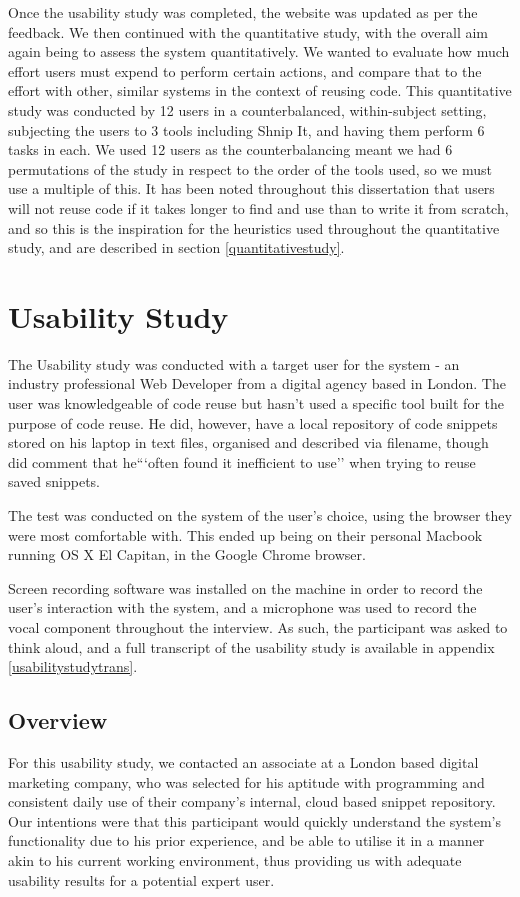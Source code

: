 Once the usability study was completed, the website was updated as per the feedback. 
We then continued with the quantitative study, with the overall aim again being to assess the system quantitatively.
We wanted to evaluate how much effort users must expend to perform certain actions, and compare that to the effort with other, similar systems in the context of reusing code. 
This quantitative study was conducted by 12 users in a counterbalanced, within-subject setting, subjecting the users to 3 tools including Shnip It, and having them perform 6 tasks in each.
We used 12 users as the counterbalancing meant we had 6 permutations of the study in respect to the order of the tools used, so we must use a multiple of this.
It has been noted throughout this dissertation that users will not reuse code if it takes longer to find and use than to write it from scratch, and so this is the inspiration for the heuristics used throughout the quantitative study, and are described in section \ref{quantitativestudy}.


\section{Usability Study} \label{usabilitystudy}

The Usability study was conducted with a target user for the system - an industry professional Web Developer from a digital agency based in London. 
The user was knowledgeable of code reuse but hasn't used a specific tool built for the purpose of code reuse. 
He did, however, have a local repository of code snippets stored on his laptop in text files, organised and described via filename, though did comment that he```often found it inefficient to use'' when trying to reuse saved snippets.

The test was conducted on the system of the user's choice, using the browser they were most comfortable with. 
This ended up being on their personal Macbook running OS X El Capitan, in the Google Chrome browser.

Screen recording software was installed on the machine in order to record the user's interaction with the system, and a microphone was used to record the vocal component throughout the interview. As such, the participant was asked to think aloud, and a full transcript of the usability study is available in appendix \ref{usabilitystudytrans}.


\subsection{Overview}
For this usability study, we contacted an associate at a London based digital marketing company, who was selected for his aptitude with programming and consistent daily use of their company's internal, cloud based snippet repository.
Our intentions were that this participant would quickly understand the system's functionality due to his prior experience, and be able to utilise it in a manner akin to his current working environment, thus providing us with adequate usability results for a potential expert user.


